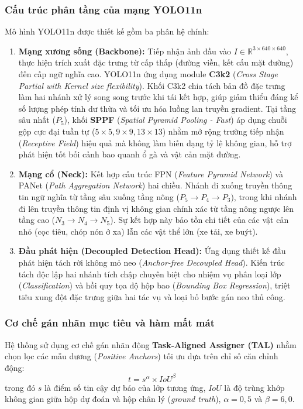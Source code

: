 \subsubsection{Cấu trúc phân tầng của mạng YOLO11n}
Mô hình YOLO11n được thiết kế gồm ba phân hệ chính:
\begin{enumerate}
    \item \textbf{Mạng xương sống (Backbone):} 
    Tiếp nhận ảnh đầu vào $I \in \mathbb{R}^{3 \times 640 \times 640}$, thực hiện trích xuất đặc trưng từ cấp thấp (đường viền, kết cấu mặt đường) đến cấp ngữ nghĩa cao. YOLO11n ứng dụng module \textbf{C3k2} (\textit{Cross Stage Partial with Kernel size flexibility}). Khối C3k2 chia tách bản đồ đặc trưng làm hai nhánh xử lý song song trước khi tái kết hợp, giúp giảm thiểu đáng kể số lượng phép tính dư thừa và tối ưu hóa luồng lan truyền gradient. Tại tầng sâu nhất ($P_5$), khối \textbf{SPPF} (\textit{Spatial Pyramid Pooling - Fast}) áp dụng chuỗi gộp cực đại tuần tự ($5 \times 5, 9 \times 9, 13 \times 13$) nhằm mở rộng trường tiếp nhận (\textit{Receptive Field}) hiệu quả mà không làm biến dạng tỷ lệ không gian, hỗ trợ phát hiện tốt bối cảnh bao quanh ổ gà và vật cản mặt đường.
    
    \item \textbf{Mạng cổ (Neck):} 
    Kết hợp cấu trúc FPN (\textit{Feature Pyramid Network}) và PANet (\textit{Path Aggregation Network}) hai chiều. Nhánh đi xuống truyền thông tin ngữ nghĩa từ tầng sâu xuống tầng nông ($P_5 \to P_4 \to P_3$), trong khi nhánh đi lên truyền thông tin định vị không gian chính xác từ tầng nông ngược lên tầng cao ($N_3 \to N_4 \to N_5$). Sự kết hợp này bảo tồn chi tiết của các vật cản nhỏ (cọc tiêu, chóp nón ở xa) lẫn các vật thể lớn (xe tải, xe buýt).

    \item \textbf{Đầu phát hiện (Decoupled Detection Head):} 
    Ứng dụng thiết kế đầu phát hiện tách rời không mỏ neo (\textit{Anchor-free Decoupled Head}). Kiến trúc tách độc lập hai nhánh tích chập chuyên biệt cho nhiệm vụ phân loại lớp (\textit{Classification}) và hồi quy tọa độ hộp bao (\textit{Bounding Box Regression}), triệt tiêu xung đột đặc trưng giữa hai tác vụ và loại bỏ bước gán neo thủ công.
\end{enumerate}

\subsubsection{Cơ chế gán nhãn mục tiêu và hàm mất mát}
Hệ thống sử dụng cơ chế gán nhãn động \textbf{Task-Aligned Assigner (TAL)} nhằm chọn lọc các mẫu dương (\textit{Positive Anchors}) tối ưu dựa trên chỉ số căn chỉnh động:
\begin{equation}
\label{eq:task_aligned_metric}
t = s^\alpha \times IoU^\beta
\end{equation}
trong đó $s$ là điểm số tin cậy dự báo của lớp tương ứng, $IoU$ là độ trùng khớp không gian giữa hộp dự đoán và hộp chân lý (\textit{ground truth}), $\alpha = 0,5$ và $\beta = 6,0$.

